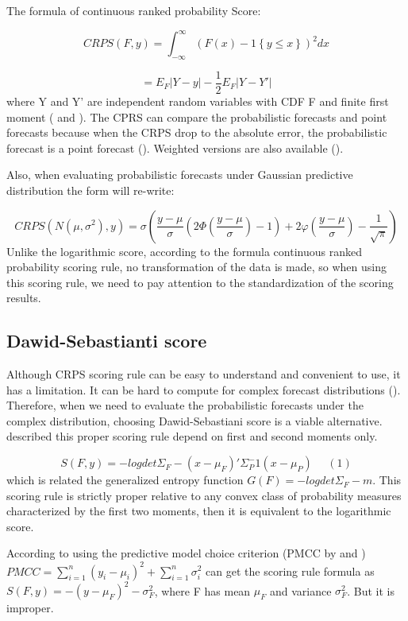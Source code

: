 \documentclass{monashthesis}
\theoremstyle{definition}
\theoremstyle{definition}
\theoremstyle{definition}
\theoremstyle{remark}
\begin{document}
The formula of continuous ranked probability Score:

\[
       CRPS(F,y)=\int_{-\infty}^{\infty}(F(x)-1\left\{y\leq{x}\right\})^2 dx
   \]

\[
    = E_F|Y-y|-\frac{1}{2}E_F|Y-Y'|
  \] where Y and Y' are independent random variables with CDF F and
finite first moment (\textcite{GR07} and \textcite{MW76}). The CPRS can
compare the probabilistic forecasts and point forecasts because when the
CRPS drop to the absolute error, the probabilistic forecast is a point
forecast (\textcite{GK14}). Weighted versions are also available
(\textcite{GR11}).

Also, when evaluating probabilistic forecasts under Gaussian predictive
distribution the form will re-write:

\[
       CRPS(N(\mu,\sigma^2),y)=\sigma\left(\frac{y-\mu}{\sigma}\left(2\Phi\left(\frac{y-\mu}{\sigma}\right)-1\right)+2\varphi\left(\frac{y-\mu}{\sigma}\right)-\frac{1}{\sqrt{\pi}}\right)
   \] Unlike the logarithmic score, according to the formula continuous
ranked probability scoring rule, no transformation of the data is made,
so when using this scoring rule, we need to pay attention to the
standardization of the scoring results.

\subsection{Dawid-Sebastianti score}\label{dawid-sebastianti-score}

Although CRPS scoring rule can be easy to understand and convenient to
use, it has a limitation. It can be hard to compute for complex forecast
distributions (\textcite{GK14}). Therefore, when we need to evaluate the
probabilistic forecasts under the complex distribution, choosing
Dawid-Sebastiani score is a viable alternative. \textcite{DS99}
described this proper scoring rule depend on first and second moments
only.

\[S(F,y)=-logdet\Sigma_F-(x-\mu_F)'\Sigma_P^-1(x-\mu_P)~~~~~~(1)\] which
is related the generalized entropy function \(G(F)=-logdet\Sigma_F-m\).
This scoring rule is strictly proper relative to any convex class of
probability measures characterized by the first two moments, then it is
equivalent to the logarithmic score.

According to \textcite{GR07} using the predictive model choice criterion
(PMCC by \textcite{LI95} and \textcite{GG98})
\(PMCC=\sum_{i=1}^{n}(y_i-\mu_i)^2+\sum_{i=1}^{n}\sigma_i^2\) can get
the scoring rule formula as \(S(F,y)=-(y-\mu_F)^2-\sigma_F^2\), where F
has mean \(\mu_F\) and variance \(\sigma_F^2\). But it is improper.
\end{document}
